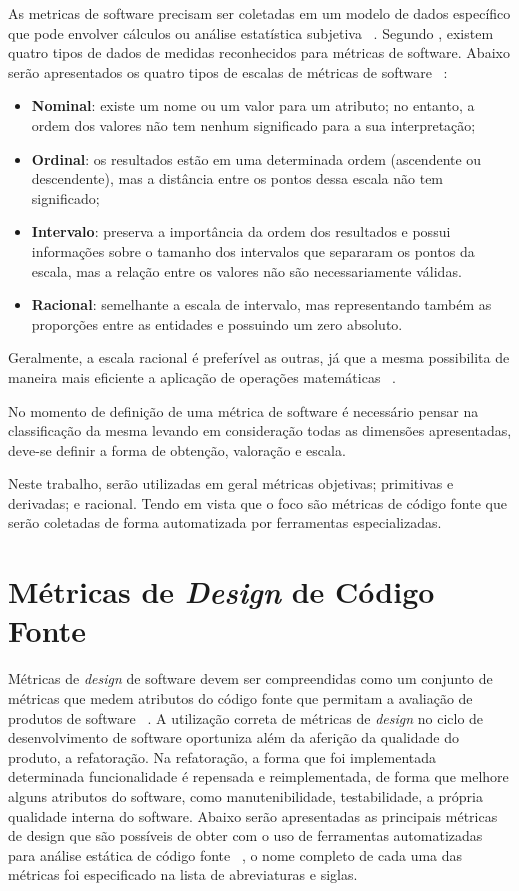 As metricas de software precisam ser coletadas em um modelo de dados específico que pode envolver cálculos ou análise 
estatística subjetiva ~\cite{meirelles2013}. Segundo , existem quatro tipos de dados de medidas
reconhecidos para métricas de software. Abaixo serão apresentados os quatro tipos de escalas de métricas de software 
~\cite{meirelles2013}:

\begin{itemize}
  \item \textbf{Nominal}: existe um nome ou um valor para um atributo; no entanto, a ordem dos valores não tem nenhum 
    significado para a sua interpretação;
  \item \textbf{Ordinal}: os resultados estão em uma determinada ordem (ascendente ou descendente), mas a distância entre os 
    pontos dessa escala não tem significado;
  \item \textbf{Intervalo}: preserva a importância da ordem dos resultados e possui informações sobre o tamanho dos intervalos
    que separaram os pontos da escala, mas a relação entre os valores não são necessariamente válidas.
  \item \textbf{Racional}: semelhante a escala de intervalo, mas representando também as proporções entre as entidades e
    possuindo um zero absoluto. 
\end{itemize}

Geralmente, a escala racional é preferível as outras, já que a mesma possibilita de maneira mais eficiente a aplicação de 
operações matemáticas ~\cite{meirelles2013}.

No momento de definição de uma métrica de software é necessário pensar na classificação da mesma levando em consideração
todas as dimensões apresentadas, deve-se definir a forma de obtenção, valoração e escala.

Neste trabalho, serão utilizadas em geral métricas objetivas; primitivas e derivadas; e racional. Tendo em vista que o 
foco são métricas de código fonte que serão coletadas de forma automatizada por ferramentas especializadas.

\section{Métricas de \textit{Design} de Código Fonte}

Métricas de \textit{design} de software devem ser compreendidas como um conjunto de métricas que medem atributos do código 
fonte que permitam a avaliação de produtos de software ~\cite{arthur&carlos2014}. A utilização correta de métricas de \textit{design} no ciclo
de desenvolvimento de software oportuniza além da aferição da qualidade do produto, a refatoração. Na refatoração, a forma que
foi implementada determinada funcionalidade é repensada e reimplementada, de forma que melhore alguns atributos do software,
como manutenibilidade, testabilidade, a própria qualidade interna do software. Abaixo serão apresentadas as principais métricas
de design que são possíveis de obter com o uso de ferramentas automatizadas para análise estática de código fonte 
~\cite{arthur&carlos2014,meirelles2013}, o nome completo de cada uma das métricas foi especificado na lista de abreviaturas e 
siglas.

